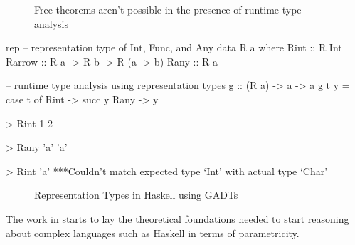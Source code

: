 \begin{figure}
  \caption{Free theorems aren't possible in the presence of runtime type analysis}
  \label{fig:noFree}
\end{figure}

\begin{SaveVerbatim}{rep}
-- representation type of Int, Func, and Any
data R a where
  Rint :: R Int
  Rarrow :: R a -> R b -> R (a -> b)
  Rany :: R a

-- runtime type analysis using representation types
g :: (R a) -> a -> a
g t y = case t of
             Rint -> succ y
             Rany -> y

> Rint 1
2

> Rany 'a'
'a'

> Rint 'a'
***Couldn't match expected type `Int' with actual type `Char'
\end{SaveVerbatim}

\begin{figure}
  \caption{Representation Types in Haskell using GADTs}
  \label{fig:rep}
\end{figure}


The work in \cite{vytinFree} starts to lay the theoretical foundations needed to start reasoning about complex languages such as Haskell in terms of parametricity.



